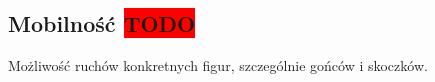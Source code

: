\subsection{Mobilność \colorbox{red}{TODO}}
\label{subsec:mobilnosc}

{
    \color{red}
    \large Możliwość ruchów konkretnych figur, szczególnie gońców i skoczków.
}